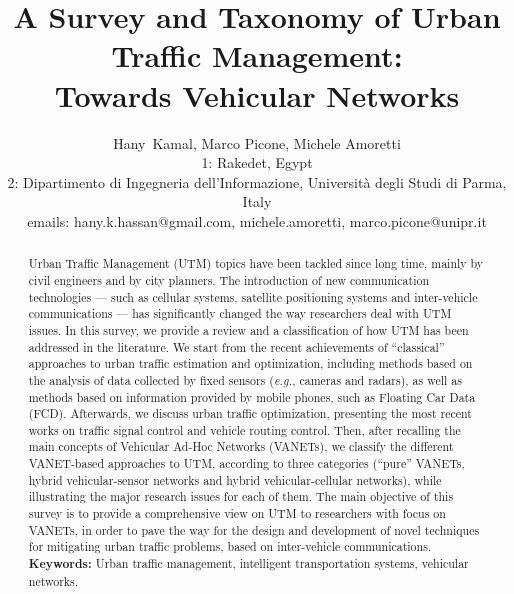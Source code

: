 \documentclass[10pt,onecolumn]{article}
\begin{document}
\title{A Survey and Taxonomy of Urban Traffic Management:\\ Towards Vehicular Networks}

\author{
\small Hany~Kamal, Marco Picone, Michele Amoretti\\
\small 1: Rakedet, Egypt\\
\small 2: Dipartimento di Ingegneria dell'Informazione, Universit\`a degli Studi di Parma, Italy\\
\small emails: hany.k.hassan@gmail.com, {michele.amoretti, marco.picone}@unipr.it
}

\date{}

\maketitle

\doublespacing

\begin{abstract}
Urban Traffic Management (UTM) topics have been tackled since long time, mainly by civil engineers and by city planners. The introduction of new communication technologies --- such as cellular systems, satellite positioning systems and inter-vehicle communications --- has significantly changed the way researchers deal with UTM issues. In this survey, we provide a review and a classification of how UTM has been addressed in the literature. We start from the recent achievements of ``classical'' approaches to urban traffic estimation and optimization, including methods based on the analysis of data collected by fixed sensors (\textit{e.g.}, cameras and radars), as well as methods based on information provided by mobile phones, such as Floating Car Data (FCD). Afterwards, we discuss urban traffic optimization, presenting the most recent works on traffic signal control and vehicle routing control. Then, after recalling the main concepts of Vehicular Ad-Hoc Networks (VANETs), we classify the different VANET-based approaches to UTM, according to three categories (``pure'' VANETs, hybrid vehicular-sensor networks and hybrid vehicular-cellular networks), while illustrating the major research issues for each of them. 
The main objective of this survey is to provide a comprehensive view on UTM to researchers with focus on VANETs, in order to pave the way for the design and development of novel techniques for mitigating urban traffic problems, based on inter-vehicle communications. 
\\
\textbf{Keywords:} Urban traffic management, intelligent transportation systems, vehicular networks.
\end{abstract}
\end{document}
